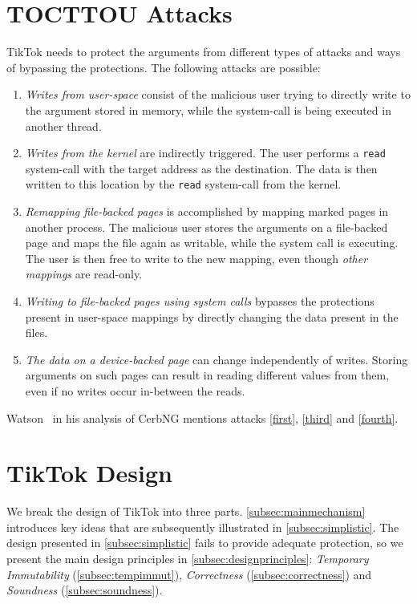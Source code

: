 \documentclass[conference]{IEEEtran}
\newcommand{\sysname}{TikTok}
\begin{document}
\section{TOCTTOU Attacks}

\sysname{} needs to protect the arguments from different types of attacks and ways of
bypassing the protections. The following attacks are possible:

\begin{enumerate}
  \item \label{first} \emph{Writes from user-space} consist of the malicious user trying to directly
  write to the argument stored in memory, while the system-call is being executed
  in another thread. 
  \item \label{second} \emph{Writes from the kernel} are indirectly triggered. The user performs a
  \texttt{read} system-call with the target address as the destination. The data
  is then written to this location by the \texttt{read} system-call from the
  kernel.
  \item \label{third} \emph{Remapping file-backed pages} is accomplished by mapping marked pages in
  another process. The malicious user stores the arguments on a file-backed page
  and maps the file again as writable, while the system call is executing. The
  user is then free to write to the new mapping, even though \emph{other mappings}
  are read-only.
  \item \label{fourth} \emph{Writing to file-backed pages using system calls} bypasses
  the protections present in user-space mappings by directly changing the data present in
  the files.
  \item \label{fifth} \emph{The data on a device-backed page} can change
  independently of writes. Storing arguments on such pages can result in reading
  different values from them, even if no writes occur in-between the reads.
\end{enumerate}

Watson~\cite{watson2007exploiting} in his analysis of CerbNG mentions attacks
\autoref{first}, \autoref{third} and \autoref{fourth}.

\section{\sysname{} Design}
\label{sec:design}

We break the design of \sysname{} into three parts.
\autoref{subsec:mainmechanism} introduces key ideas that are subsequently
illustrated in \autoref{subsec:simplistic}. The design presented in
\autoref{subsec:simplistic} fails to provide adequate protection, so we present
the main design principles in \autoref{subsec:designprinciples}: \emph{Temporary
Immutability} (\autoref{subsec:tempimmut}), \emph{Correctness}
(\autoref{subsec:correctness}) and \emph{Soundness} (\autoref{subsec:soundness}).
\end{document}
